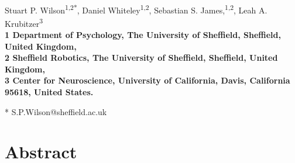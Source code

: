 \documentclass[10pt,letterpaper]{article}
\date{}
\begin{document}
\vspace*{0.2in}

\begin{flushleft}
{\Large
\textbf\newline{%
Modelling the Evolution of Cortical Development: A Baldwin Effect}
}
\newline
\\
Stuart P. Wilson\textsuperscript{1,2*}, Daniel Whiteley\textsuperscript{1,2}, Sebastian S. James,\textsuperscript{1,2}, Leah A. Krubitzer\textsuperscript{3}
\\
\bigskip
\bf{1} Department of Psychology, The University of Sheffield, Sheffield, United Kingdom,\\
\bf{2} Sheffield Robotics, The University of Sheffield, Sheffield, United Kingdom,\\
\bf{3} Center for Neuroscience, University of California, Davis, California 95618, United States.
\bigskip

* S.P.Wilson@sheffield.ac.uk

\end{flushleft}

\section*{Abstract}
\end{document}
